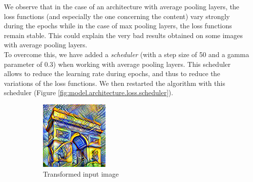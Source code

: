 \documentclass[twocolumn,superscriptaddress,aps, floatfix]{revtex4-1}
\begin{document}
    We observe that in the case of an architecture with average pooling layers, the loss functions (and especially the one concerning the content) vary strongly during the epochs while in the case of max pooling layers, the loss functions remain stable. This could explain the very bad results obtained on some images with average pooling layers.\\
    
    To overcome this, we have added a \emph{scheduler} (with a step size of 50 and a gamma parameter of 0.3) when working with average pooling layers. This scheduler allows to reduce the learning rate during epochs, and thus to reduce the variations of the loss functions. We then restarted the algorithm with this scheduler (Figure \ref{fig:model.architecture.loss.scheduler}).
    
    \begin{figure}[ht]
        \centering
        \begin{subfigure}[b]{0.22\textwidth}
            \centering
            \includegraphics[width=\textwidth]{resources/png/architecture/sun-trees-paris-avgpool-scheduler.png}
            \caption{Transformed input image}
        \end{subfigure}
        \hfill
        \begin{subfigure}[b]{0.22\textwidth}
            \centering

\end{subfigure}
\end{figure}
\end{document}
